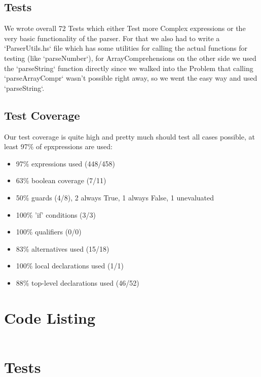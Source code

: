 \documentclass[12pt,a4paper]{article}
\begin{document}
\subsection{Tests}

We wrote overall 72 Tests which either Test more Complex expressions or the very basic functionality of the parser.
For that we also had to write a `ParserUtils.hs` file which has some utilities for calling the actual functions for testing (like `parseNumber`), for ArrayComprehensions on the other side we used the `parseString` function directly since we walked into the Problem that calling `parseArrayCompr` wasn't possible right away, so we went the easy way and used `parseString`.

\subsection{Test Coverage}
Our test coverage is quite high and pretty much should test all cases possible, at least 97\% of epxpressions are used:
\begin{itemize}
	\item  97\% expressions used (448/458)
 	\item 63\% boolean coverage (7/11)
     \item 50\% guards (4/8), 2 always True, 1 always False, 1 unevaluated
     \item 100\% 'if' conditions (3/3)
     \item 100\% qualifiers (0/0)
 	 \item 83\% alternatives used (15/18)
	 \item 100\% local declarations used (1/1)
 	 \item 88\% top-level declarations used (46/52)
\end{itemize}

\appendix
\section{Code Listing}

\inputminted{haskell}{handin/src/Parser/Impl.hs}

\section{Tests}

\inputminted{haskell}{handin/tests/Test.hs}

\inputminted{haskell}{handin/tests/ParserUtils.hs}
\end{document}
